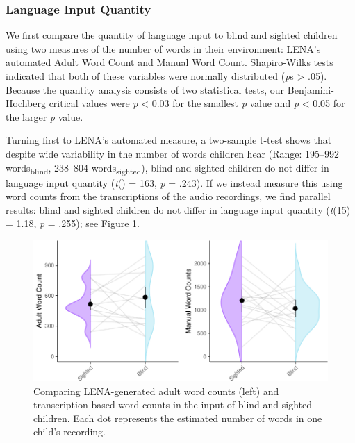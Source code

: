 \documentclass[
  man]{apa6}
\begin{document}
\hypertarget{language-input-quantity}{%
\subsubsection{Language Input Quantity}\label{language-input-quantity}}

We first compare the quantity of language input to blind and sighted children using two measures of the number of words in their environment: LENA's automated Adult Word Count and Manual Word Count. Shapiro-Wilks tests indicated that both of these variables were normally distributed (\emph{p}s \textgreater{} .05). Because the quantity analysis consists of two statistical tests, our Benjamini-Hochberg critical values were \emph{p} \textless{} 0.03 for the smallest \emph{p} value and \emph{p} \textless{} 0.05 for the larger \emph{p} value.

Turning first to LENA's automated measure, a two-sample t-test shows that despite wide variability in the number of words children hear (Range: 195--992 words\textsubscript{blind}, 238--804 words\textsubscript{sighted}), blind and sighted children do not differ in language input quantity (\emph{t}() = 163, \emph{p} = .243). If we instead measure this using word counts from the transcriptions of the audio recordings, we find parallel results: blind and sighted children do not differ in language input quantity (\emph{t}(15) = 1.18, \emph{p} = .255); see Figure \ref{fig:quantity-plots}.

\begin{figure}
\centering
\includegraphics{input_quality_manuscript_files/figure-latex/quantity-plots-1.pdf}
\caption{\label{fig:quantity-plots}Comparing LENA-generated adult word counts (left) and transcription-based word counts in the input of blind and sighted children. Each dot represents the estimated number of words in one child's recording.}
\end{figure}
\end{document}
